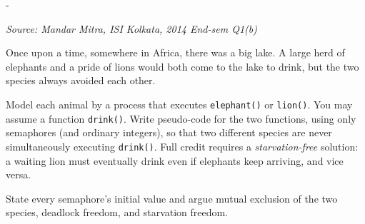 \documentclass[11pt,a4paper]{article}
\makeatletter
\newcommand{\keepspace}[1]{\par\penalty-100\begingroup
  \setlength{\dimen@}{#1}\dimen@ii\pagegoal\advance\dimen@ii-\pagetotal
  \ifdim\dimen@>\dimen@ii\ifdim\dimen@ii>\z@\vfil\fi\break\fi\endgroup}
\newcounter{qn}[section]
\newenvironment{Qn}[4]{%
  \refstepcounter{qn}\keepspace{7\baselineskip}%
  \begin{tcolorbox}[qboxstyle, title={Q\thesection.\theqn\ \ [#1 \textbar\ #2]\ \ #4}]%
  {\footnotesize\color{g3}\textit{Source: #3}}\par\smallskip%
}{%
  \end{tcolorbox}%
}
\makeatother
\begin{document}
\begin{Qn}{Hard}{Lect 19}{Mandar Mitra, ISI Kolkata, 2014 End-sem Q1(b)}{Elephants and lions at the lake}
Once upon a time, somewhere in Africa, there was a big lake. A large herd of
elephants and a pride of lions would both come to the lake to drink, but the
two species always avoided each other.

Model each animal by a process that executes \texttt{elephant()} or
\texttt{lion()}. You may assume a function \texttt{drink()}. Write
pseudo-code for the two functions, using only semaphores (and ordinary
integers), so that two different species are never simultaneously executing
\texttt{drink()}. Full credit requires a \emph{starvation-free} solution:
a waiting lion must eventually drink even if elephants keep arriving, and
vice versa.

State every semaphore's initial value and argue mutual exclusion of the two
species, deadlock freedom, and starvation freedom.
\end{Qn}
\end{document}
